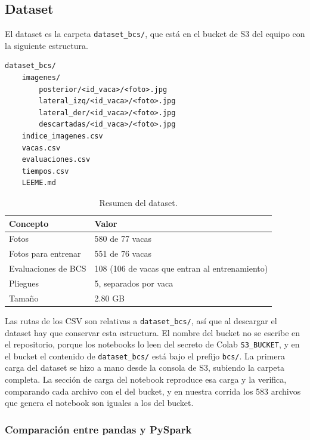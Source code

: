\subsection{Dataset}\label{sec:dataset}

El dataset es la carpeta \nolinkurl{dataset_bcs/}, que está en el bucket de S3 del equipo con la siguiente estructura.

\begin{verbatim}
dataset_bcs/
    imagenes/
        posterior/<id_vaca>/<foto>.jpg
        lateral_izq/<id_vaca>/<foto>.jpg
        lateral_der/<id_vaca>/<foto>.jpg
        descartadas/<id_vaca>/<foto>.jpg
    indice_imagenes.csv
    vacas.csv
    evaluaciones.csv
    tiempos.csv
    LEEME.md
\end{verbatim}

\begin{table}[H]
  \centering
  \caption{Resumen del dataset.}
  \label{tab:dataset}
  \begin{tabular}{ll}
    \toprule
    Concepto & Valor \\
    \midrule
    Fotos & 580 de 77 vacas \\
    Fotos para entrenar & 551 de 76 vacas \\
    Evaluaciones de BCS & 108 (106 de vacas que entran al entrenamiento) \\
    Pliegues & 5, separados por vaca \\
    Tamaño & 2.80 GB \\
    \bottomrule
  \end{tabular}
\end{table}

Las rutas de los CSV son relativas a \nolinkurl{dataset_bcs/}, así que al descargar el dataset hay que conservar esta estructura. El nombre del bucket no se escribe en el repositorio, porque los notebooks lo leen del secreto de Colab \texttt{S3\_BUCKET}, y en el bucket el contenido de \nolinkurl{dataset_bcs/} está bajo el prefijo \nolinkurl{bcs/}. La primera carga del dataset se hizo a mano desde la consola de S3, subiendo la carpeta completa. La sección de carga del notebook reproduce esa carga y la verifica, comparando cada archivo con el del bucket, y en nuestra corrida los 583 archivos que genera el notebook son iguales a los del bucket.

\subsubsection*{Comparación entre pandas y PySpark}


